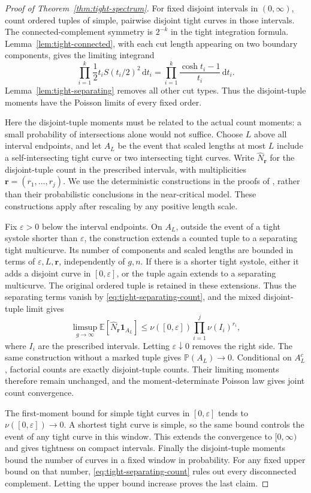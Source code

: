\begin{proof}[Proof of Theorem~\ref{thm:tight-spectrum}]
For fixed disjoint intervals in $(0,\infty)$, count ordered tuples
of simple, pairwise disjoint tight curves in those intervals.
The connected-complement symmetry is $2^{-k}$ in the tight integration
formula. Lemma~\ref{lem:tight-connected}, with each cut length
appearing on two boundary components, gives the limiting integrand
\[
 \prod_{i=1}^k\frac12 t_i S(t_i/2)^2\,\mathrm dt_i
 =\prod_{i=1}^k\frac{\cosh t_i-1}{t_i}\,\mathrm dt_i.
\]
Lemma~\ref{lem:tight-separating} removes all other cut types.
Thus the disjoint-tuple moments have the Poisson limits of every
fixed order.

Here the disjoint-tuple moments must be related to the actual count
moments: a small probability of intersections alone would not suffice.
Choose $L$ above all interval endpoints, and let $A_L$ be the event that
scaled lengths at most $L$ include a
self-intersecting tight curve or two intersecting tight curves. Write
$\widehat N_{\mathbf r}$ for the disjoint-tuple count in the prescribed
intervals, with multiplicities $\mathbf r=(r_1,\ldots,r_j)$.
We use the deterministic constructions in the proofs of
\cite[Propositions~5.2--5.3]{BL}, rather than their probabilistic
conclusions in the near-critical model. These constructions apply after
rescaling by any positive length scale.

Fix $\varepsilon>0$ below the interval endpoints. On $A_L$, outside
the event of a tight systole shorter than $\varepsilon$, the construction
extends a counted tuple to a separating tight multicurve. Its number of
components and scaled lengths are bounded in terms of
$\varepsilon,L,\mathbf r$, independently of $g,n$. If there is a shorter
tight systole, either it adds a disjoint curve in $[0,\varepsilon]$, or
the tuple again extends to a separating multicurve. The original ordered
tuple is retained in these extensions. Thus the separating terms vanish
by \eqref{eq:tight-separating-count}, and the mixed disjoint-tuple limit gives
\[
 \limsup_{g\to\infty}\mathbb E[
   \widehat N_{\mathbf r}\mathbf1_{A_L}]
 \le \nu([0,\varepsilon])\prod_{i=1}^j\nu(I_i)^{r_i},
\]
where $I_i$ are the prescribed intervals. Letting $\varepsilon\downarrow0$
removes the right side. The same construction without a marked tuple
gives $\mathbb P(A_L)\to0$. Conditional on $A_L^c$, factorial counts
are exactly disjoint-tuple counts. Their limiting moments therefore
remain unchanged, and the moment-determinate Poisson law gives joint
count convergence.

The first-moment bound for simple tight curves in $[0,\varepsilon]$
tends to $\nu([0,\varepsilon])\to0$. A shortest tight curve is
simple, so the same bound controls the event of any tight curve in
this window. This extends the convergence to $[0,\infty)$ and gives
tightness on compact intervals. Finally the disjoint-tuple moments
bound the number of curves in a fixed window in probability.
For any fixed upper bound on that number,
\eqref{eq:tight-separating-count} rules out every disconnected
complement. Letting the upper bound increase proves the last claim.
\end{proof}

